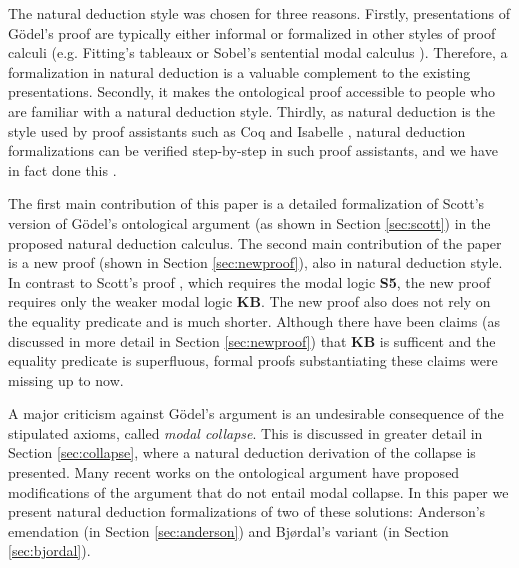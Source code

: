 \documentclass[smallextended]{svjour3}
\begin{document}
The natural deduction style was chosen for three reasons. Firstly, presentations of G\"odel's proof are typically either informal or formalized in other styles of proof calculi (e.g. Fitting's tableaux \citep{fitting} or Sobel's sentential modal calculus \citep{sobel2}). Therefore, a formalization in natural deduction is a valuable complement to the existing presentations. Secondly, it makes the ontological proof accessible to people who are familiar with a natural deduction style. Thirdly, as natural deduction is the style used by proof assistants such as Coq \citep{coq} and Isabelle \citep{isabelle}, natural deduction formalizations can be verified step-by-step in such proof assistants, and we have in fact done this \citep{CSRModalLogicCoq}.

The first main contribution of this paper is a detailed formalization of Scott's version \citep{scott} of G\"odel's ontological argument \citep{Goedel} (as shown in Section \ref{sec:scott}) in the proposed natural deduction calculus. The second main contribution of the paper is a new proof (shown in Section \ref{sec:newproof}), also in natural deduction style. In contrast to Scott's proof \citep{scott}, which requires the modal logic \textbf{S5}, the new proof requires only the weaker modal logic \textbf{KB}. The new proof also does not rely on the equality predicate and is much shorter. Although there have been claims (as discussed in more detail in Section \ref{sec:newproof}) that \textbf{KB} is sufficent and the equality predicate is superfluous, formal proofs substantiating these claims were missing up to now.

A major criticism against G\"odel's argument is an undesirable consequence of the stipulated axioms, called \emph{modal collapse}. This is discussed in greater detail in Section \ref{sec:collapse}, where a natural deduction derivation of the collapse is presented. Many recent works on the ontological argument have proposed modifications of the argument that do not entail modal collapse. In this paper we present natural deduction formalizations of two of these solutions: Anderson's emendation (in Section \ref{sec:anderson}) and Bj{\o}rdal's variant (in Section \ref{sec:bjordal}).
\end{document}
